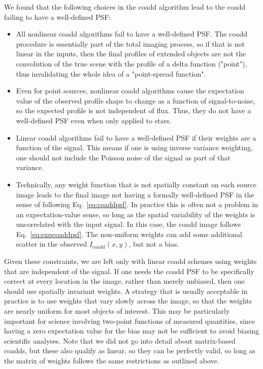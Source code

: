 \documentclass{openjournal}
\newcommand{\irresponse}[1]{{#1}}
\begin{document}
We found that the following choices in the coadd algorithm lead to the coadd failing to
have a well-defined PSF:
\begin{itemize}
    \item All nonlinear coadd algorithms fail to have a well-defined PSF.  The coadd procedure is essentially part of the total imaging process, so if that is not linear in the inputs, then the final profiles of extended objects are not the convolution of the true scene with the profile of a delta function ("point"), thus invalidating the whole idea of a "point-spread function".
    \item Even for point sources, nonlinear coadd algorithms \irresponse{cause the expectation value of the observed profile shape to change} as a function of signal-to-noise, so the expected profile is not independent of flux.  Thus, they do not have a well-defined PSF even when only applied to stars.
    \item Linear coadd algorithms fail to have a well-defined PSF if their weights are a function of the signal.  This means if one is using inverse variance weighting, one should not include the Poisson noise of the signal as part of that variance.
    \item Technically, any weight function that is not spatially constant on each source image leads to the final image not having a formally well-defined PSF in the sense of following Eq.~\eqref{eq:coaddpsf}.  In practice this is \irresponse{often} not a problem in an expectation-value sense, so long as the spatial variability of the weights is uncorrelated with the input signal.  In this case, the coadd image follows Eq.~\eqref{eq:expcoaddpsf}. The non-uniform weights can add some additional scatter in the observed $I_\mathrm{coadd}(x,y)$, but not a bias. 
\end{itemize}

Given these constraints, we are left only with linear coadd schemes using weights that are independent of the signal.  If one needs the coadd PSF to be specifically correct at every location in the image, rather than merely unbiased, then one should use spatially invariant weights. \irresponse{A strategy that is usually acceptable in practice is to use weights that vary slowly across the image, so that the weights are nearly uniform for most objects of interest.  This may be particularly important for science involving two-point functions of measured quantities, since having a zero expectation value for the bias may not be sufficient to avoid biasing scientific analyses.} Note that we did not go into detail about matrix-based coadds, but these also qualify as linear, so they can be perfectly valid, so long as the matrix of weights follows the same restrictions \irresponse{as outlined above}.
\end{document}

